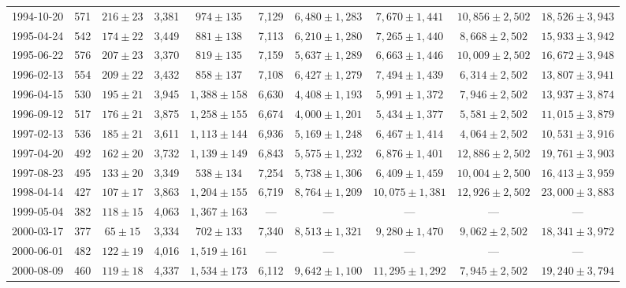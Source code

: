 \begin{landscape}
\begin{longtable}{cccccccccc}
{1994-10-20} & 571 & {$216  \pm  23$} & 3,381 & {$974 \pm 135$} & 7,129 & {$6,480 \pm 1,283$} & {$7,670 \pm 1,441$} & {$10,856 \pm 2,502$} & {$18,526 \pm 3,943$} \\
{1995-04-24} & 542 & {$174  \pm  22$} & 3,449 & {$881 \pm 138$} & 7,113 & {$6,210 \pm 1,280$} & {$7,265 \pm 1,440$} & {$8,668 \pm 2,502$} & {$15,933 \pm 3,942$} \\
{1995-06-22} & 576 & {$207  \pm  23$} & 3,370 & {$819 \pm 135$} & 7,159 & {$5,637 \pm 1,289$} & {$6,663 \pm 1,446$} & {$10,009 \pm 2,502$} & {$16,672 \pm 3,948$} \\
{1996-02-13} & 554 & {$209  \pm  22$} & 3,432 & {$858 \pm 137$} & 7,108 & {$6,427 \pm 1,279$} & {$7,494 \pm 1,439$} & {$6,314 \pm 2,502$} & {$13,807 \pm 3,941$} \\
{1996-04-15} & 530 & {$195  \pm  21$} & 3,945 & {$1,388 \pm 158$} & 6,630 & {$4,408 \pm 1,193$} & {$5,991 \pm 1,372$} & {$7,946 \pm 2,502$} & {$13,937 \pm 3,874$} \\
{1996-09-12} & 517 & {$176  \pm  21$} & 3,875 & {$1,258 \pm 155$} & 6,674 & {$4,000 \pm 1,201$} & {$5,434 \pm 1,377$} & {$5,581 \pm 2,502$} & {$11,015 \pm 3,879$} \\
{1997-02-13} & 536 & {$185  \pm  21$} & 3,611 & {$1,113 \pm 144$} & 6,936 & {$5,169 \pm 1,248$} & {$6,467 \pm 1,414$} & {$4,064 \pm 2,502$} & {$10,531 \pm 3,916$} \\
{1997-04-20} & 492 & {$162  \pm  20$} & 3,732 & {$1,139 \pm 149$} & 6,843 & {$5,575 \pm 1,232$} & {$6,876 \pm 1,401$} & {$12,886 \pm 2,502$} & {$19,761 \pm 3,903$} \\
{1997-08-23} & 495 & {$133  \pm  20$} & 3,349 & {$538 \pm 134$} & 7,254 & {$5,738 \pm 1,306$} & {$6,409 \pm 1,459$} & {$10,004 \pm 2,500$} & {$16,413 \pm 3,959$} \\
{1998-04-14} & 427 & {$107  \pm  17$} & 3,863 & {$1,204 \pm 155$} & 6,719 & {$8,764 \pm 1,209$} & {$10,075 \pm 1,381$} & {$12,926 \pm 2,502$} & {$23,000 \pm 3,883$} \\
{1999-05-04} & 382 & {$118  \pm  15$} & 4,063 & {$1,367 \pm 163$} & --- & --- & --- & --- & --- \\
{2000-03-17} & 377 & {$65  \pm  15$} & 3,334 & {$702 \pm 133$} & 7,340 & {$8,513 \pm 1,321$} & {$9,280 \pm 1,470$} & {$9,062 \pm 2,502$} & {$18,341 \pm 3,972$} \\
{2000-06-01} & 482 & {$122  \pm  19$} & 4,016 & {$1,519 \pm 161$} & --- & --- & --- & --- & --- \\
{2000-08-09} & 460 & {$119  \pm  18$} & 4,337 & {$1,534 \pm 173$} & 6,112 & {$9,642 \pm 1,100$} & {$11,295 \pm 1,292$} & {$7,945 \pm 2,502$} & {$19,240 \pm 3,794$} \\

\end{longtable}
\end{landscape}
